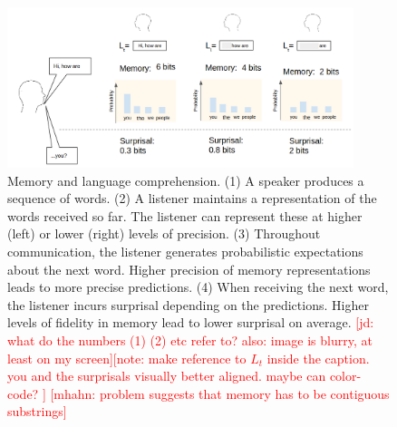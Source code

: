 \documentclass[12pt]{article}
\newcommand{\jd}[1]{\textcolor{Red}{[jd: #1]}}
\newcommand{\note}[1]{\textcolor{Red}{[note: #1]}}
\newcommand{\mhahn}[1]{\textcolor{Red}{[mhahn: #1]}}
\begin{document}


\begin{figure}
\centering
\includegraphics[width=0.9\textwidth]{figures-gdrive/communication.png}
	\caption{Memory and language comprehension. (1) A speaker produces a sequence of words. (2) A listener maintains a representation of the words received so far. The listener can represent these at higher (left) or lower (right) levels of precision. (3) Throughout communication, the listener generates probabilistic expectations about the next word. Higher precision of memory representations leads to more precise predictions. (4) When receiving the next word, the listener incurs surprisal depending on the predictions. Higher levels of fidelity in memory lead to lower surprisal on average. \jd{what do the numbers (1) (2) etc refer to? also: image is blurry, at least on my screen}\note{make reference to $L_t$ inside the caption. you and the surprisals visually better aligned. maybe can color-code? } \mhahn{problem suggests that memory has to be contiguous substrings}}
	\label{fig:communication}
\end{figure}
\end{document}
